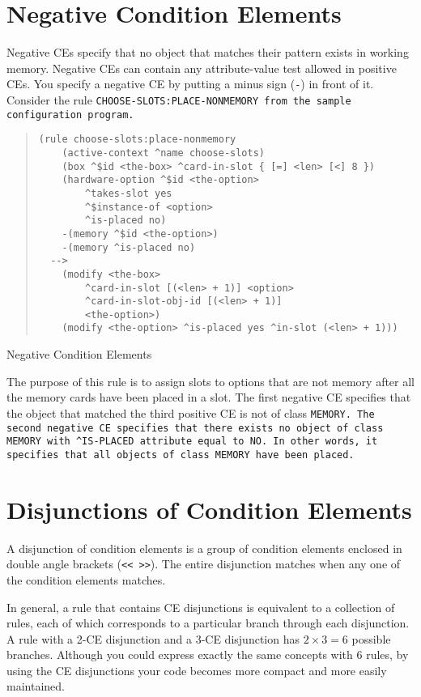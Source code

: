 \section{Negative Condition Elements}

Negative CEs specify that no object that matches their pattern exists
in working memory. Negative CEs can contain any attribute-value test
allowed in positive CEs. You specify a negative CE by putting a minus
sign (\verb|-|) in front of it. Consider the rule
\tt{CHOOSE-SLOTS:PLACE-NONMEMORY} from the sample configuration
program.

\begin{example}[!h]
\begin{quote}
\begin{verbatim}
(rule choose-slots:place-nonmemory
    (active-context ^name choose-slots)
    (box ^$id <the-box> ^card-in-slot { [=] <len> [<] 8 })
    (hardware-option ^$id <the-option>
        ^takes-slot yes
        ^$instance-of <option>
        ^is-placed no)
    -(memory ^$id <the-option>)
    -(memory ^is-placed no)
  -->
    (modify <the-box>
        ^card-in-slot [(<len> + 1)] <option>
        ^card-in-slot-obj-id [(<len> + 1)]
        <the-option>)
    (modify <the-option> ^is-placed yes ^in-slot (<len> + 1)))
\end{verbatim}
\end{quote} 
\caption{Negative Condition Elements}
\end{example}
The purpose of this rule is to assign slots to options that are not
memory after all the memory cards have been placed in a slot. The
first negative CE specifies that the object that matched the third
positive CE is not of class \tt{MEMORY}. The second negative CE
specifies that there exists no object of class \tt{MEMORY} with
\verb|^IS-PLACED| attribute equal to \tt{NO}. In other words, it
specifies that all objects of class \tt{MEMORY} have been placed.

\section{Disjunctions of Condition Elements}

A disjunction of condition elements is a group of condition elements
enclosed in double angle brackets (\verb|<< >>|). The entire
disjunction matches when any one of the condition elements matches.

In general, a rule that contains CE disjunctions is equivalent to a
collection of rules, each of which corresponds to a particular branch
through each disjunction. A rule with a 2-CE disjunction and a 3-CE
disjunction has $2 \times 3 = 6$ possible branches. Although you could
express exactly the same concepts with 6 rules, by using the CE
disjunctions your code becomes more compact and more easily
maintained.

